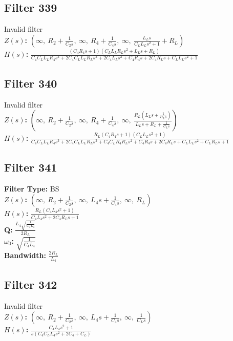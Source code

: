 \documentclass{article}
\begin{document}
\subsection*{Filter 339}
Invalid filter \\ 
\textbf{$Z(s)$:} $\left( \infty, \  R_{2} + \frac{1}{C_{2} s}, \  \infty, \  R_{4} + \frac{1}{C_{4} s}, \  \infty, \  \frac{L_{L} s}{C_{L} L_{L} s^{2} + 1} + R_{L}\right)$ \\ 
\textbf{$H(s)$:} $\frac{\left(C_{4} R_{4} s + 1\right) \left(C_{L} L_{L} R_{L} s^{2} + L_{L} s + R_{L}\right)}{C_{4} C_{L} L_{L} R_{4} s^{3} + 2 C_{4} C_{L} L_{L} R_{L} s^{3} + 2 C_{4} L_{L} s^{2} + C_{4} R_{4} s + 2 C_{4} R_{L} s + C_{L} L_{L} s^{2} + 1}$ \\ 
\subsection*{Filter 340}
Invalid filter \\ 
\textbf{$Z(s)$:} $\left( \infty, \  R_{2} + \frac{1}{C_{2} s}, \  \infty, \  R_{4} + \frac{1}{C_{4} s}, \  \infty, \  \frac{R_{L} \left(L_{L} s + \frac{1}{C_{L} s}\right)}{L_{L} s + R_{L} + \frac{1}{C_{L} s}}\right)$ \\ 
\textbf{$H(s)$:} $\frac{R_{L} \left(C_{4} R_{4} s + 1\right) \left(C_{L} L_{L} s^{2} + 1\right)}{C_{4} C_{L} L_{L} R_{4} s^{3} + 2 C_{4} C_{L} L_{L} R_{L} s^{3} + C_{4} C_{L} R_{4} R_{L} s^{2} + C_{4} R_{4} s + 2 C_{4} R_{L} s + C_{L} L_{L} s^{2} + C_{L} R_{L} s + 1}$ \\ 
\subsection*{Filter 341}
\textbf{Filter Type:} BS \\ 
\textbf{$Z(s)$:} $\left( \infty, \  R_{2} + \frac{1}{C_{2} s}, \  \infty, \  L_{4} s + \frac{1}{C_{4} s}, \  \infty, \  R_{L}\right)$ \\ 
\textbf{$H(s)$:} $\frac{R_{L} \left(C_{4} L_{4} s^{2} + 1\right)}{C_{4} L_{4} s^{2} + 2 C_{4} R_{L} s + 1}$ \\ 
\textbf{Q:} $\frac{L_{4} \sqrt{\frac{1}{C_{4} L_{4}}}}{2 R_{L}}$ \\ 
\textbf{$\omega_0$:} $\sqrt{\frac{1}{C_{4} L_{4}}}$ \\ 
\textbf{Bandwidth:} $\frac{2 R_{L}}{L_{4}}$ \\ 
\subsection*{Filter 342}
Invalid filter \\ 
\textbf{$Z(s)$:} $\left( \infty, \  R_{2} + \frac{1}{C_{2} s}, \  \infty, \  L_{4} s + \frac{1}{C_{4} s}, \  \infty, \  \frac{1}{C_{L} s}\right)$ \\ 
\textbf{$H(s)$:} $\frac{C_{4} L_{4} s^{2} + 1}{s \left(C_{4} C_{L} L_{4} s^{2} + 2 C_{4} + C_{L}\right)}$ \\ 
\end{document}
